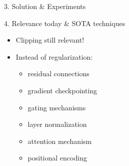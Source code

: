 \documentclass[final]{beamer}
\begin{document}
\begin{frame}[t]
\begin{columns}[t,totalwidth=\textwidth]
\begin{column}{0.33\textwidth}
\begin{block}{3. Solution \& Experiments}
    \end{block}
  
    \vspace{1em}
  
    \begin{block}{4. Relevance today \& SOTA techniques}
      \begin{itemize}
        \item Clipping still relevant!
        \item Instead of regularization:
        \begin{itemize}
          \item residual connections
          \item gradient checkpointing
          \item gating mechanisms
          \item layer normalization
          \item attention mechanism
          \item positional encoding
        \end{itemize}
      \end{itemize}
    \end{block}
  \end{column}
  

  \end{columns}

\end{frame}
\end{document}
